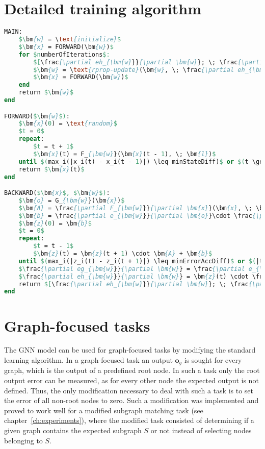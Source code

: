\section{Detailed training algorithm}
\begin{lstlisting}[mathescape, style=outcode, language=pascal, caption=The learning algorithm]
MAIN:
	$\bm{w} = \text{initialize}$
	$\bm{x} = FORWARD(\bm{w})$
	for $numberOfIterations$:
		$[\frac{\partial eh_{\bm{w}}}{\partial \bm{w}}; \; \frac{\partial eg_{\bm{w}}}{\partial \bm{w}}] = BACKWARD(\bm{x}, \; \bm{w})$
		$\bm{w} = \text{rprop-update}(\bm{w}, \; \frac{\partial eh_{\bm{w}}}{\partial \bm{w}}, \; \frac{\partial eg_{\bm{w}}}{\partial \bm{w}})$
		$\bm{x} = FORWARD(\bm{w})$
	end
	return $\bm{w}$
end

FORWARD($\bm{w}$):
	$\bm{x}(0) = \text{random}$
	$t = 0$
	repeat:
		$t = t + 1$
		$\bm{x}(t) = F_{\bm{w}}(\bm{x}(t - 1), \; \bm{l})$
	until $(max_i(|x_i(t) - x_i(t - 1)|) \leq minStateDiff)$ or $(t \geq maxForwardSteps)$
	return $\bm{x}(t)$
end

BACKWARD($\bm{x}$, $\bm{w}$):
	$\bm{o} = G_{\bm{w}}(\bm{x})$
	$\bm{A} = \frac{\partial F_{\bm{w}}}{\partial \bm{x}}(\bm{x}, \; \bm{l})$
	$\bm{b} = \frac{\partial e_{\bm{w}}}{\partial \bm{o}}\cdot \frac{\partial G_{\bm{w}}}{\partial \bm{x}}(\bm{x})$
	$\bm{z}(0) = \bm{b}$
	$t = 0$
	repeat:
		$t = t - 1$
		$\bm{z}(t) = \bm{z}(t + 1) \cdot \bm{A} + \bm{b}$
	until $(max_i(|z_i(t) - z_i(t + 1)|) \leq minErrorAccDiff)$ or $(|t| \geq maxBackwardSteps)$
	$\frac{\partial eg_{\bm{w}}}{\partial \bm{w}} = \frac{\partial e_{\bm{w}}}{\partial \bm{o}}\cdot \frac{\partial G_{\bm{w}}}{\partial \bm{w}}(\bm{x})$
	$\frac{\partial eh_{\bm{w}}}{\partial \bm{w}} = \bm{z}(t) \cdot \frac{\partial F_{\bm{w}}}{\partial \bm{w}}(\bm{x}, \bm{l}) + \frac{\partial p_{\bm{w}}}{\partial \bm{w}}$
	return $[\frac{\partial eh_{\bm{w}}}{\partial \bm{w}}; \; \frac{\partial eg_{\bm{w}}}{\partial \bm{w}}]$
end
\end{lstlisting}

\section{Graph-focused tasks}
The GNN model can be used for graph-focused tasks by modifying the standard learning algorithm. In a graph-focused task an output $\bm{o}_g$ is sought for every graph, which is the output of a predefined root node. In such a task only the root output error can be measured, as for every other node the expected output is not defined. Thus, the only modification necessary to deal with such a task is to set the error of all non-root nodes to zero. Such a modification was implemented and proved to work well for a modified subgraph matching task (see chapter~\ref{ch:experiments}), where the modified task consisted of determining if a given graph contains the expected subgraph $S$ or not instead of selecting nodes belonging to $S$.
